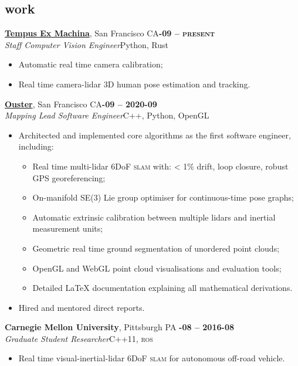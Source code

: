 \documentclass[margin,10pt]{res}
\begin{document}
\begin{resume}
\section{\sc \lsstyle work}
    \href{https://tempus-ex.com}{\textbf{Tempus Ex Machina}}, San Francisco CA\hfill \textsc{\bfseries{}-09 -- present}\\
    \textit{Staff Computer Vision Engineer}\hfill Python, Rust
    \vspace{0.5em}
    \begin{itemize}
        \item Automatic real time camera calibration;
        \item Real time camera-lidar 3D human pose estimation and tracking.
    \end{itemize}

    \href{https://ouster.io}{\textbf{Ouster}}, San Francisco CA\hfill \textsc{\bfseries{}-09 -- 2020-09}\\
    \textit{Mapping Lead Software Engineer}\hfill C++, Python, OpenGL
    \vspace{0.5em}
    \begin{itemize}
        \item Architected and implemented core algorithms as the first software engineer, including:
        \begin{itemize}
            \item Real time multi-lidar 6DoF \textsc{slam} with: < 1\% drift, loop closure, robust GPS georeferencing;
            \item On-manifold SE(3) Lie group optimiser for continuous-time pose graphs;
            \item Automatic extrinsic calibration between multiple lidars and inertial measurement units;
            \item Geometric real time ground segmentation of unordered point clouds;
            \item OpenGL and WebGL point cloud visualisations and evaluation tools;
            \item Detailed LaTeX documentation explaining all mathematical derivations.
        \end{itemize}
        \item Hired and mentored direct reports.
    \end{itemize}

    \textbf{Carnegie Mellon University}, Pittsburgh PA \hfill \textsc{\bfseries{}-08 -- 2016-08}\\
    \textit{Graduate Student Researcher}\hfill C++11, \textsc{ros}
    \vspace{0.5em}
    \begin{itemize}
        \item Real time visual-inertial-lidar 6DoF \textsc{slam} for autonomous off-road vehicle.
    \end{itemize}


\end{resume}
\end{document}

